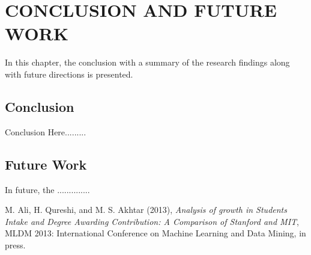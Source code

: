 \documentclass[12pt,a4paper,oneside]{book} %
\begin{document}
\chapter{CONCLUSION AND FUTURE WORK}\label{c-conclusion}

In this chapter, the conclusion with a summary of the research findings along with future directions is presented.

\section{Conclusion}
Conclusion Here.........

\section{Future Work}
In future, the ..............

\begin{thebibliography}{10}

M. Ali, H. Qureshi, and M. S. Akhtar (2013), \emph{Analysis of growth in Students Intake and Degree Awarding Contribution: A Comparison of Stanford and MIT}, MLDM 2013: International Conference on Machine Learning and Data Mining, in press.

\end{thebibliography}
\end{document}
